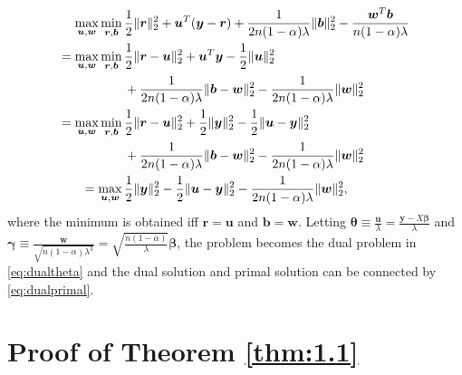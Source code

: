 \begin{gather}
    \label{eq:dualuw}
    \begin{aligned}
        \underset{\boldsymbol u,\boldsymbol w}{\mathrm{max}}\,\underset{\boldsymbol r,\boldsymbol b}{\mathrm{min}}\,&\frac{1}{2}\lVert\boldsymbol r\rVert_2^2+\boldsymbol u^T(\boldsymbol y-\boldsymbol r)+\frac{1}{2n(1-\alpha)\lambda}\lVert\boldsymbol b\rVert_2^2-\frac{\boldsymbol w^T\boldsymbol b}{n(1-\alpha)\lambda}\\
        =\underset{\boldsymbol u,\boldsymbol w}{\mathrm{max}}\,\underset{\boldsymbol r,\boldsymbol b}{\mathrm{min}}\,&\frac{1}{2}\lVert\boldsymbol r-\boldsymbol u\rVert_2^2+\boldsymbol u^T\boldsymbol y-\frac{1}{2}\lVert\boldsymbol u\rVert_2^2\\
        &+\frac{1}{2n(1-\alpha)\lambda}\lVert\boldsymbol b-\boldsymbol w\rVert_2^2-\frac{1}{2n(1-\alpha)\lambda}\lVert\boldsymbol w\rVert_2^2\\
        =\underset{\boldsymbol u,\boldsymbol w}{\mathrm{max}}\,\underset{\boldsymbol r,\boldsymbol b}{\mathrm{min}}\,&\frac{1}{2}\lVert\boldsymbol r-\boldsymbol u\rVert_2^2+\frac{1}{2}\lVert\boldsymbol y\rVert_2^2-\frac{1}{2}\lVert\boldsymbol u-\boldsymbol y\rVert_2^2\\
        &+\frac{1}{2n(1-\alpha)\lambda}\lVert\boldsymbol b-\boldsymbol w\rVert_2^2-\frac{1}{2n(1-\alpha)\lambda}\lVert\boldsymbol w\rVert_2^2\\
        =\underset{\boldsymbol u,\boldsymbol w}{\mathrm{max}}\,&\frac{1}{2}\lVert\boldsymbol y\rVert_2^2-\frac{1}{2}\lVert\boldsymbol u-\boldsymbol y\rVert_2^2-\frac{1}{2n(1-\alpha)\lambda}\lVert\boldsymbol w\rVert_2^2,
    \end{aligned}
\end{gather}
where the minimum is obtained iff $\boldsymbol r=\boldsymbol u$ and $\boldsymbol b=\boldsymbol w$. Letting $\boldsymbol\theta\equiv\frac{\boldsymbol u}{\lambda}=\frac{\boldsymbol y-X\boldsymbol\beta}{\lambda}$ and $\boldsymbol\gamma\equiv\frac{\boldsymbol w}{\sqrt{n(1-\alpha)\lambda^3}}=\sqrt{\frac{n(1-\alpha)}{\lambda}}\boldsymbol\beta$, the problem becomes the dual problem in \eqref{eq:dualtheta} and the dual solution and primal solution can be connected by \eqref{eq:dualprimal}.

\section{Proof of Theorem \ref{thm:1.1}}


